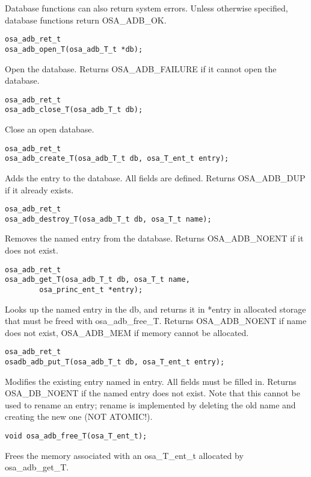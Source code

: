 Database functions can also return system errors.  Unless otherwise
specified, database functions return OSA_ADB_OK.

\begin{verbatim}
osa_adb_ret_t
osa_adb_open_T(osa_adb_T_t *db);
\end{verbatim}
%
Open the database.  Returns OSA_ADB_FAILURE if it cannot open the
database. 

\begin{verbatim}
osa_adb_ret_t
osa_adb_close_T(osa_adb_T_t db);
\end{verbatim}
%
Close an open database.

\begin{verbatim}
osa_adb_ret_t
osa_adb_create_T(osa_adb_T_t db, osa_T_ent_t entry);
\end{verbatim}
%
Adds the entry to the database.  All fields are defined.  Returns
OSA_ADB_DUP if it already exists.

\begin{verbatim}
osa_adb_ret_t
osa_adb_destroy_T(osa_adb_T_t db, osa_T_t name);
\end{verbatim}

Removes the named entry from the database.  Returns OSA_ADB_NOENT if
it does not exist.

\begin{verbatim}
osa_adb_ret_t
osa_adb_get_T(osa_adb_T_t db, osa_T_t name,
        osa_princ_ent_t *entry); 
\end{verbatim}

Looks up the named entry in the db, and returns it in *entry in
allocated storage that must be freed with osa_adb_free_T.  Returns
OSA_ADB_NOENT if name does not exist, OSA_ADB_MEM if memory cannot be
allocated.

\begin{verbatim}
osa_adb_ret_t
osadb_adb_put_T(osa_adb_T_t db, osa_T_ent_t entry);
\end{verbatim}

Modifies the existing entry named in entry.  All fields must be filled
in.  Returns OSA_DB_NOENT if the named entry does not exist.  Note
that this cannot be used to rename an entry; rename is implemented by
deleting the old name and creating the new one (NOT ATOMIC!).

\begin{verbatim}
void osa_adb_free_T(osa_T_ent_t);
\end{verbatim}

Frees the memory associated with an osa_T_ent_t allocated by
osa_adb_get_T.

